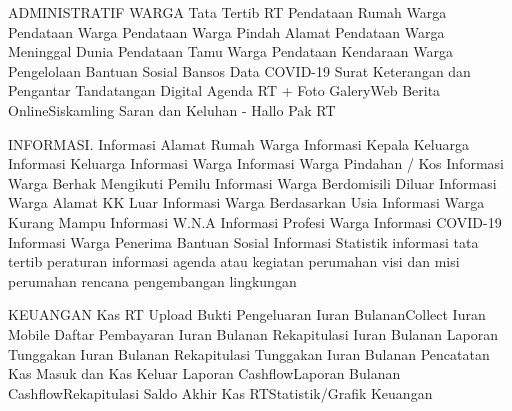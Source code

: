 ADMINISTRATIF WARGA
Tata Tertib RT
Pendataan Rumah Warga
Pendataan Warga 
Pendataan Warga Pindah Alamat
Pendataan Warga Meninggal Dunia
Pendataan Tamu Warga
Pendataan Kendaraan Warga
Pengelolaan Bantuan Sosial Bansos 
Data COVID-19
Surat Keterangan dan Pengantar
Tandatangan Digital
Agenda RT + Foto GaleryWeb 
Berita OnlineSiskamling
Saran dan Keluhan - Hallo Pak RT


INFORMASI.
Informasi Alamat Rumah Warga
Informasi Kepala Keluarga
Informasi Keluarga
Informasi Warga
Informasi Warga Pindahan / Kos
Informasi Warga Berhak Mengikuti Pemilu
Informasi Warga Berdomisili Diluar
Informasi Warga Alamat KK Luar
Informasi Warga Berdasarkan Usia
Informasi Warga Kurang Mampu
Informasi W.N.A
Informasi Profesi Warga
Informasi COVID-19
Informasi Warga Penerima Bantuan Sosial
Informasi Statistik 
informasi tata tertib peraturan
informasi agenda atau kegiatan perumahan
visi dan misi perumahan
rencana pengembangan lingkungan



KEUANGAN
Kas RT
Upload Bukti Pengeluaran
Iuran BulananCollect
Iuran Mobile
Daftar Pembayaran Iuran Bulanan
Rekapitulasi Iuran Bulanan
Laporan Tunggakan Iuran Bulanan
Rekapitulasi Tunggakan Iuran Bulanan
Pencatatan Kas Masuk dan Kas Keluar
Laporan CashflowLaporan Bulanan 
CashflowRekapitulasi Saldo Akhir 
Kas RTStatistik/Grafik Keuangan
